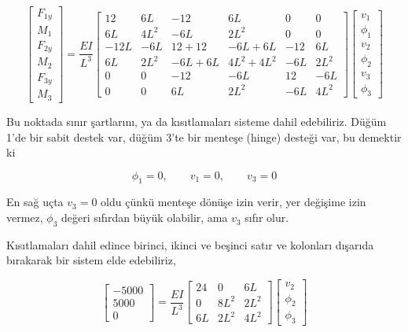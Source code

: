 \documentclass[12pt,fleqn]{article}\usepackage{../../common}
\begin{document}
$$
\left[\begin{array}{c}
F_{1y} \\ M_1 \\ F_{2y} \\ M_2 \\ F_{3y} \\ M_3
\end{array}\right] =
\frac{EI}{L^3}
\left[\begin{array}{cccccc}
12 & 6L & -12 & 6L & 0 & 0 \\
6L & 4L^2 & -6L & 2L^2 & 0 & 0 \\
-12L & -6L & 12+12 & -6L+6L & -12 & 6L \\
6L & 2L^2 & -6L+6L & 4L^2+4L^2 & -6L & 2L^2 \\
0 & 0 & -12 & -6L & 12 & -6L \\
0 & 0 & 6L & 2L^2 & -6L & 4L^2
\end{array}\right]
\left[\begin{array}{c}
v_1 \\ \phi_1 \\ v_2 \\ \phi_2 \\ v_3 \\ \phi_3
\end{array}\right]
$$

Bu noktada sınır şartlarını, ya da kısıtlamaları sisteme dahil edebiliriz.
Düğüm 1'de bir sabit destek var, düğüm 3'te bir menteşe (hinge) desteği var,
bu demektir ki

$$
\phi_1 = 0, \qquad
v_1 = 0, \qquad
v_3 = 0
$$

En sağ uçta $v_3 = 0$ oldu çünkü menteşe dönüşe izin verir, yer değişime
izin vermez, $\phi_3$ değeri sıfırdan büyük olabilir, ama $v_3$ sıfır olur.

Kısıtlamaları dahil edince birinci, ikinci ve beşinci satır ve kolonları
dışarıda bırakarak bir sistem elde edebiliriz,

$$
\left[\begin{array}{c}
-5000 \\ 5000 \\ 0
\end{array}\right] =
\frac{EI}{L^3}
\left[\begin{array}{ccc}
24 & 0 & 6L \\
0 & 8L^2 & 2L^2 \\
6L & 2L^2 & 4L^2
\end{array}\right]
\left[\begin{array}{c}
v_2 \\ \phi_2 \\ \phi_3
\end{array}\right]
$$
\end{document}
